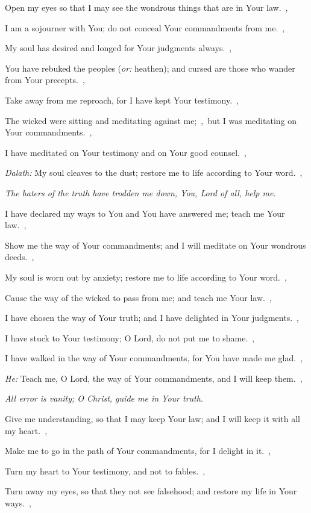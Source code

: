\documentclass[12pt,twoside,a5paper]{article}
\newcommand{\qanona}[1]{{\liturgicalhint{Qanona.} \emph{#1}}}
\newcommand{\translationoption}[1]{\emph{or:} #1}
\begin{document}
\begin{normalparskip}
  Open my eyes so that I may see the wondrous things that are in Your law.~\sep

  I am a sojourner with You; do not conceal Your commandments from me.~\sep

  My soul has desired and longed for Your judgments always.~\sep

  You have rebuked the peoples (\translationoption{heathen}); and cursed are those who wander from Your precepts.~\sep

  Take away from me reproach, for I have kept Your testimony.~\sep

  The wicked were sitting and meditating against me;~\sep\ but I was meditating on Your commandments.~\sep

  I have meditated on Your testimony and on Your good counsel.~\sep

  \emph{Dalath:} My soul cleaves to the dust; restore me to life according to Your word.~\sep

  \qanona{The haters of the truth have trodden me down, You, Lord of all, help me.}

  I have declared my ways to You and You have answered me; teach me Your law.~\sep

  Show me the way of Your commandments; and I will meditate on Your wondrous deeds.~\sep

  My soul is worn out by anxiety; restore me to life according to Your word.~\sep

  Cause the way of the wicked to pass from me; and teach me Your law.~\sep

  I have chosen the way of Your truth; and I have delighted in Your judgments.~\sep

  I have stuck to Your testimony; O Lord, do not put me to shame.~\sep

  I have walked in the way of Your commandments, for You have made me glad.~\sep

  \emph{He:} Teach me, O Lord, the way of Your commandments, and I will keep them.~\sep

  \qanona{All error is vanity; O Christ, guide me in Your truth.}

  Give me understanding, so that I may keep Your law; and I will keep it with all my heart.~\sep

  Make me to go in the path of Your commandments, for I delight in it.~\sep

  Turn my heart to Your testimony, and not to fables.~\sep

  Turn away my eyes, so that they not see falsehood; and restore my life in Your ways.~\sep


\end{normalparskip}
\end{document}
